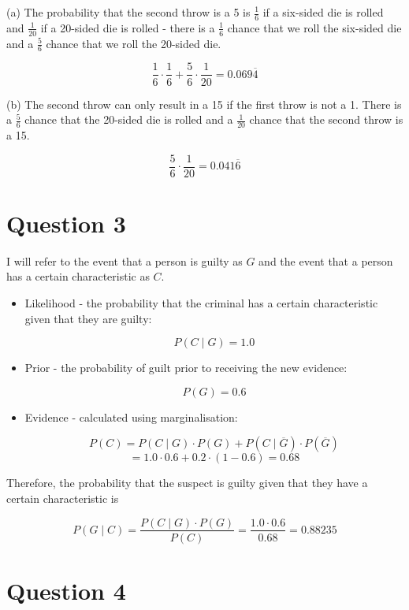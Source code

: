 \documentclass[12pt]{article}
\begin{document}
\noindent (a) The probability that the second throw is a 5 is $\frac{1}{6}$ if a six-sided die is rolled and $\frac{1}{20}$ if a 20-sided die is rolled - there is a $\frac{1}{6}$ chance that we roll the six-sided die and a $\frac{5}{6}$ chance that we roll the 20-sided die.

$$ \frac{1}{6} \cdot \frac{1}{6} + \frac{5}{6} \cdot \frac{1}{20} = 0.069\overline{4} $$

\noindent (b) The second throw can only result in a 15 if the first throw is not a 1. There is a $\frac{5}{6}$ chance that the 20-sided die is rolled and a $\frac{1}{20}$ chance that the second throw is a 15.

$$ \frac{5}{6} \cdot \frac{1}{20} = 0.041\overline{6} $$

\section*{Question 3}

\noindent I will refer to the event that a person is guilty as $G$ and the event that a person has a certain characteristic as $C$.

\begin{itemize}

    \item Likelihood - the probability that the criminal has a certain characteristic given that they are guilty:
    
    $$ P(C \mid G) = 1.0 $$
    
    \item Prior - the probability of guilt prior to receiving the new evidence:
    
    $$ P(G) = 0.6 $$
    
    \item Evidence - calculated using marginalisation:

    $$ P(C) = P(C \mid G) \cdot P(G) + P(C \mid \overline{G}) \cdot P(\overline{G}) $$
    $$ = 1.0 \cdot 0.6 + 0.2 \cdot (1 - 0.6) = 0.68 $$
    
\end{itemize}

\indent Therefore, the probability that the suspect is guilty given that they have a certain characteristic is

$$ P(G \mid C) = \frac{P(C \mid G) \cdot P(G)}{P(C)} = \frac{1.0 \cdot 0.6}{0.68} = 0.88235 $$

\section*{Question 4}
\end{document}
